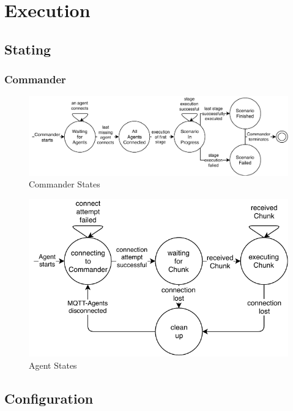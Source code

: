 \chapter{Execution}

\section{Stating}
\subsection{Commander}
\begin{figure}[h]
	\begin{center}
	\includegraphics[scale=0.9]{Resources/PDF/CommanderStates}
	\caption{Commander States}
	\label{pic:CommanderStates}
	\end{center}
\end{figure}

\begin{figure}[h]
	\begin{center}
	\includegraphics[scale=0.9]{Resources/PDF/AgentStates}
	\caption{Agent States}
	\label{pic:AgentStates}
	\end{center}
\end{figure}

\section{Configuration}
